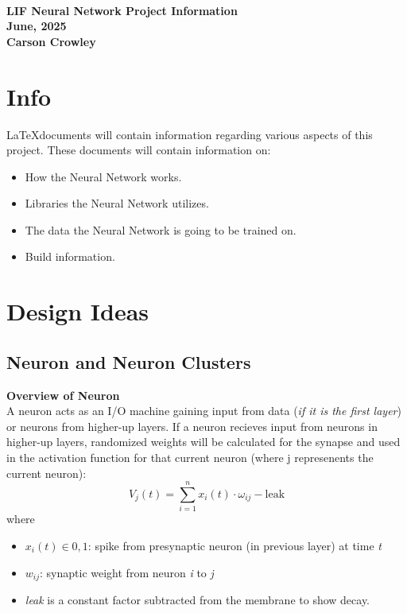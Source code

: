 \documentclass{article}
\begin{document}
 

\begin{center} 
	\text{} 
	\\[22em] 
	{\LARGE \textbf{LIF Neural Network Project Information}} \\[1em] 
	{\large \textbf{June, 2025}} \\[0.5em] 
	{\small \textbf{Carson Crowley}} 
\end{center} 

\thispagestyle{empty}
\newpage

\section{Info}
\LaTeX documents will contain information regarding various aspects of this project. These documents will contain information on: 
\begin{itemize}
	\item How the Neural Network works. 
	\item Libraries the Neural Network utilizes. 
	\item The data the Neural Network is going to be trained on. 
	\item Build information. 
\end{itemize} 

\section*{Design Ideas}
\subsection*{Neuron and Neuron Clusters}
\textbf{Overview of Neuron}\\[0.5em]
A neuron acts as an I/O machine gaining input from data (\textit{if it is the first layer}) or neurons from higher-up layers. If a neuron recieves input from neurons in higher-up layers, randomized weights will be calculated for the synapse and used in the activation function for that current neuron (where j represenents the current neuron): 
\[V_j(t) = \sum_{i=1}^{n}x_i(t)\cdot \omega_{ij} - \text{leak}\]
where
\begin{itemize} 
	  \item	\(x_i(t) \in {0,1}\): spike from presynaptic neuron (in previous layer) at time \textit{t}
	  \item \(w_{ij}\): synaptic weight from neuron \textit{i} to \textit{j} 
\item \textit{leak} is a constant factor subtracted from the membrane to show decay.
\end{itemize}
		   
\end{document}
